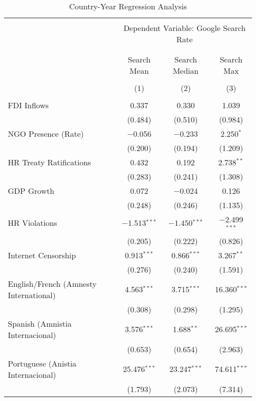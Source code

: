 
\begin{table}[!htbp] \centering 
  \caption{Country-Year Regression Analysis} 
  \label{} 
\begin{tabular}{@{\extracolsep{5pt}}lccc} 
\\[-1.8ex]\hline 
\hline \\[-1.8ex] 
 & \multicolumn{3}{c}{Dependent Variable: Google Search Rate} \\ 
\cline{2-4} 
\\[-1.8ex] & \multicolumn{3}{c}{ } \\ 
 & Search Mean & Search Median & Search Max \\ 
\\[-1.8ex] & (1) & (2) & (3)\\ 
\hline \\[-1.8ex] 
 FDI Inflows & 0.337 & 0.330 & 1.039 \\ 
  & (0.484) & (0.510) & (0.984) \\ 
  NGO Presence (Rate) & $-$0.056 & $-$0.233 & 2.250$^{*}$ \\ 
  & (0.200) & (0.194) & (1.209) \\ 
  HR Treaty Ratifications & 0.432 & 0.192 & 2.738$^{**}$ \\ 
  & (0.283) & (0.241) & (1.308) \\ 
  GDP Growth & 0.072 & $-$0.024 & 0.126 \\ 
  & (0.248) & (0.246) & (1.135) \\ 
  HR Violations & $-$1.513$^{***}$ & $-$1.450$^{***}$ & $-$2.499$^{***}$ \\ 
  & (0.205) & (0.222) & (0.826) \\ 
  Internet Censorship & 0.913$^{***}$ & 0.866$^{***}$ & 3.267$^{**}$ \\ 
  & (0.276) & (0.240) & (1.591) \\ 
  English/French (Amnesty International) & 4.563$^{***}$ & 3.715$^{***}$ & 16.360$^{***}$ \\ 
  & (0.308) & (0.298) & (1.295) \\ 
  Spanish (Amnistia Internacional) & 3.576$^{***}$ & 1.688$^{**}$ & 26.695$^{***}$ \\ 
  & (0.653) & (0.654) & (2.963) \\ 
  Portuguese (Anistia Internacional) & 25.476$^{***}$ & 23.247$^{***}$ & 74.611$^{***}$ \\ 
  & (1.793) & (2.073) & (7.314) \\ 

\end{tabular}
\end{table}
